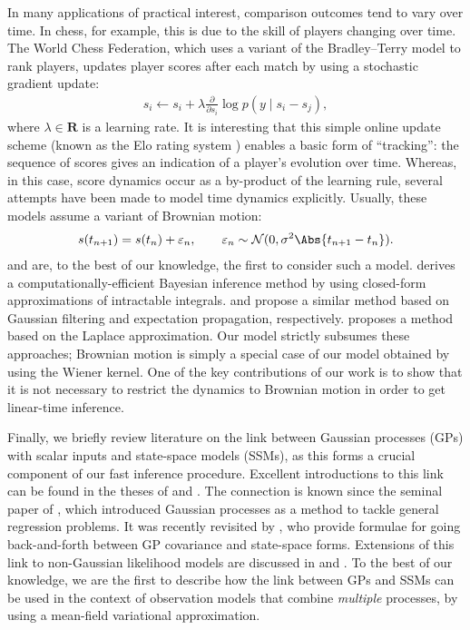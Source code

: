 In many applications of practical interest, comparison outcomes tend to vary over time.
In chess, for example, this is due to the skill of players changing over time.
The World Chess Federation, which uses a variant of the Bradley--Terry model to rank players, updates player scores after each match by using a stochastic gradient update:
\begin{align*}
s_i \gets s_i + \lambda \frac{\partial}{\partial s_i} \log p(y \mid s_i - s_j),
\end{align*}
where $\lambda \in \mathbf{R}$ is a learning rate.
It is interesting that this simple online update scheme (known as the Elo rating system \citep{elo1978rating}) enables a basic form of ``tracking'': the sequence of scores gives an indication of a player's evolution over time.
Whereas, in this case, score dynamics occur as a by-product of the learning rule, several attempts have been made to model time dynamics explicitly.
Usually, these models assume a variant of Brownian motion:
\begin{align}
\label{kks:eq:brownian}
s(t_{n+1}) = s(t_n) + \varepsilon_{n},
    \qquad \varepsilon_{n} \sim \mathcal{N}(0, \sigma^2 \Abs{t_{n+1} - t_n}).
\end{align}
\citet{glickman1993paired} and \citet{fahrmeir1994dynamic} are, to the best of our knowledge, the first to consider such a model.
\citet{glickman1999parameter} derives a computationally-efficient Bayesian inference method by using closed-form approximations of intractable integrals.
\citet{herbrich2006trueskill} and \citet{dangauthier2007trueskill} propose a similar method based on Gaussian filtering and expectation propagation, respectively.
\citet{coulom2008whole} proposes a method based on the Laplace approximation.
Our model strictly subsumes these approaches; Brownian motion is simply a special case of our model obtained by using the Wiener kernel.
One of the key contributions of our work is to show that it is not necessary to restrict the dynamics to Brownian motion in order to get linear-time inference.

Finally, we briefly review literature on the link between Gaussian processes (GPs) with scalar inputs and state-space models (SSMs), as this forms a crucial component of our fast inference procedure.
Excellent introductions to this link can be found in the theses of \citet{saatci2012scalable} and \citet{solin2016stochastic}.
The connection is known since the seminal paper of \citet{ohagan1978curve}, which introduced Gaussian processes as a method to tackle general regression problems.
It was recently revisited by \citet{hartikainen2010kalman}, who provide formulae for going back-and-forth between GP covariance and state-space forms.
Extensions of this link to non-Gaussian likelihood models are discussed in \citet{saatci2012scalable} and \citet{nickisch2018state}.
To the best of our knowledge, we are the first to describe how the link between GPs and SSMs can be used in the context of observation models that combine \emph{multiple} processes, by using a mean-field variational approximation.
